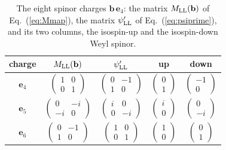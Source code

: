 \documentclass[aps,prd,twocolumn,superscriptaddress,nofootinbib,floatfix,longbibliography]{revtex4-2}
\newcommand{\LL}{{\rm LL}}
\newcommand{\e}[1]{\mathbf e_{#1}}
\begin{document}
\begin{table}[t]
\caption{The eight spinor charges $\mathbf b\,\e4$: the matrix $M_\LL(\mathbf b)$ of Eq.~(\ref{eq:Mmap}), the
matrix $\psi'_\LL$ of Eq.~(\ref{eq:psiprime}), and its two columns, the isospin-up and the isospin-down Weyl spinor.}
\label{tab:charges}
\begin{ruledtabular}
\begin{tabular}{ccccc}
charge & $M_\LL(\mathbf b)$ & $\psi'_\LL$ & up & down\\
\hline
$\e{4}$ & $\begin{pmatrix}1&0\\0&1\end{pmatrix}$ & $\begin{pmatrix}0&-1\\1&0\end{pmatrix}$ & $\begin{pmatrix}0\\1\end{pmatrix}$ & $\begin{pmatrix}-1\\0\end{pmatrix}$\\[3pt]
$\e{5}$ & $\begin{pmatrix}0&-i\\-i&0\end{pmatrix}$ & $\begin{pmatrix}i&0\\0&-i\end{pmatrix}$ & $\begin{pmatrix}i\\0\end{pmatrix}$ & $\begin{pmatrix}0\\-i\end{pmatrix}$\\[3pt]
$\e{6}$ & $\begin{pmatrix}0&-1\\1&0\end{pmatrix}$ & $\begin{pmatrix}1&0\\0&1\end{pmatrix}$ & $\begin{pmatrix}1\\0\end{pmatrix}$ & $\begin{pmatrix}0\\1\end{pmatrix}$\\[3pt]

\end{tabular}
\end{ruledtabular}
\end{table}
\end{document}
